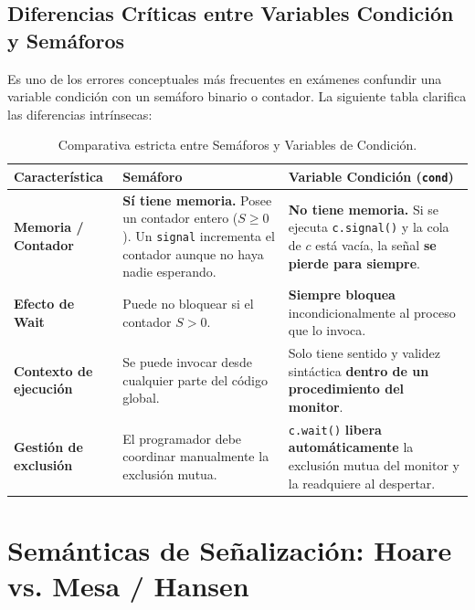 \subsection{Diferencias Críticas entre Variables Condición y Semáforos}
Es uno de los errores conceptuales más frecuentes en exámenes confundir una variable condición con un semáforo binario o contador. La siguiente tabla clarifica las diferencias intrínsecas:

\begin{table}[htbp]
\centering
\small
\begin{tabular}{>{\raggedright\arraybackslash}p{3.2cm}>{\raggedright\arraybackslash}p{5.4cm}>{\raggedright\arraybackslash}p{5.4cm}}
\toprule
\textbf{Característica} & \textbf{Semáforo} & \textbf{Variable Condición (\texttt{cond})} \\
\midrule
\textbf{Memoria / Contador} & \textbf{Sí tiene memoria.} Posee un contador entero ($S \ge 0$). Un \texttt{signal} incrementa el contador aunque no haya nadie esperando. & \textbf{No tiene memoria.} Si se ejecuta \texttt{c.signal()} y la cola de $c$ está vacía, la señal \textbf{se pierde para siempre}. \\
\addlinespace
\textbf{Efecto de Wait} & Puede no bloquear si el contador $S > 0$. & \textbf{Siempre bloquea} incondicionalmente al proceso que lo invoca. \\
\addlinespace
\textbf{Contexto de ejecución} & Se puede invocar desde cualquier parte del código global. & Solo tiene sentido y validez sintáctica \textbf{dentro de un procedimiento del monitor}. \\
\addlinespace
\textbf{Gestión de exclusión} & El programador debe coordinar manualmente la exclusión mutua. & \texttt{c.wait()} \textbf{libera automáticamente} la exclusión mutua del monitor y la readquiere al despertar. \\
\bottomrule
\end{tabular}
\caption{Comparativa estricta entre Semáforos y Variables de Condición.}
\label{tab:semaforos_vs_cond}
\end{table}

\section{Semánticas de Señalización: Hoare vs. Mesa / Hansen}

